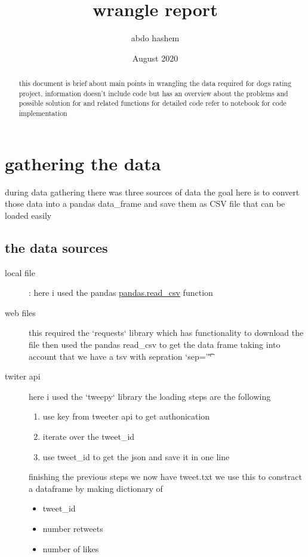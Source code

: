 \documentclass{article}
\title{wrangle report}
\author{abdo hashem}
\date{August 2020}
\begin{document}
\maketitle

\begin{abstract}
	this document is brief about main points in wrangling the data required for 
	dogs rating project, information doesn't include code but has an overview about the problems and possible solution for and related functions for detailed code refer to notebook for code implementation 
\end{abstract}

\section{gathering the data}
during data gathering there was three sources of data the goal here is to convert those data into a pandas data\_frame and save them as CSV file that can be loaded easily
\subsection{the data sources }
\begin{description}
	\item[local file] : here i used the pandas \href{https://pandas.pydata.org/pandas-docs/stable/reference/api/pandas.read_csv.html}{pandas.read\_csv} function
	\item[web files] this required the `requests` library which has functionality to download the file then used the pandas read\_csv to get the data frame taking 
	into account that we have a tsv with sepration `sep='\t'`
	\item[twiter api] here i used the `tweepy` library the loading steps are the following
	\begin{enumerate}
		\item use key from tweeter api to get authonication
		\item iterate over the tweet\_id 
		\item use tweet\_id  to get the json and save it in one line
	\end{enumerate}
	finishing the previous steps we now have tweet.txt we use this to constract a
	dataframe by making dictionary of 
	\begin{itemize}
		\item tweet\_id 
		\item number retweets
		\item number of likes
	\end{itemize}
\end{description}
\end{document}
